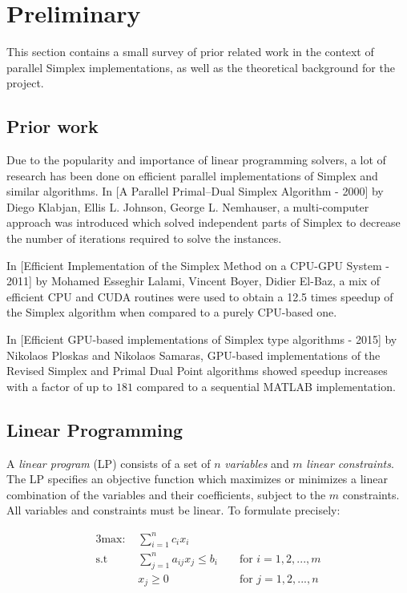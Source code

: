 \section{Preliminary}

This section contains a small survey of prior related work in the context of parallel Simplex implementations, as well as the theoretical background for the project.

\subsection{Prior work}
Due to the popularity and importance of linear programming solvers, a lot of research has been done on efficient parallel implementations of Simplex and similar algorithms. In [A Parallel Primal–Dual Simplex Algorithm - 2000] by Diego Klabjan, Ellis L. Johnson, George L. Nemhauser, a multi-computer approach was introduced which solved independent parts of Simplex to decrease the number of iterations required to solve the instances.

In [Efficient Implementation of the Simplex Method on a CPU-GPU System - 2011] by Mohamed Esseghir Lalami, Vincent Boyer, Didier El-Baz, a mix of efficient CPU and CUDA routines were used to obtain a 12.5 times speedup of the Simplex algorithm when compared to a purely CPU-based one.

In [Efficient GPU-based implementations of Simplex type algorithms - 2015] by Nikolaos Ploskas and Nikolaos Samaras, GPU-based implementations of the Revised Simplex and Primal Dual Point algorithms showed speedup increases with a factor of up to $181$ compared to a sequential MATLAB implementation.

\subsection{Linear Programming}
A \textit{linear program} (LP) consists of a set of $n$ \textit{variables} and $m$ \textit{linear constraints}. The LP specifies an objective function which maximizes or minimizes a linear combination of the variables and their coefficients, subject to the $m$ constraints. All variables and constraints must be linear. To formulate precisely:

\begin{alignat*}{3}
\text{max: } &\sum_{i=1}^{n} c_i x_i\\
\text{s.t }  & \sum_{j=1}^{n} a_{ij} x_j \leq b_i && \text{ for } i=1,2,...,m\\
& x_j \geq 0                         && \text{ for } j=1,2,...,n
\end{alignat*}

